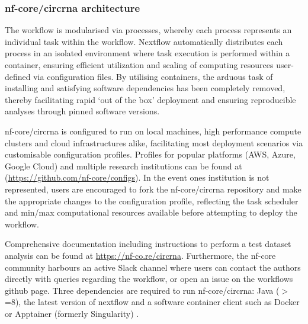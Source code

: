 \subsubsection{nf-core/circrna architecture}
The workflow is modularised via processes, whereby each process represents an individual task within the workflow. Nextflow automatically distributes each process in an isolated environment where task execution is performed within a container, ensuring efficient utilization and scaling of computing resources user-defined via configuration files. By utilising containers, the arduous task of installing and satisfying software dependencies has been completely removed, thereby facilitating rapid `out of the box' deployment and ensuring reproducible analyses through pinned software versions.
\par
nf-core/circrna is configured to run on local machines, high performance compute clusters and cloud infrastructures alike, facilitating most deployment scenarios via customisable configuration profiles. Profiles for popular platforms (AWS, Azure, Google Cloud) and multiple research institutions can be found at (\url{https://github.com/nf-core/configs}). In the event ones institution is not represented, users are encouraged to fork the nf-core/circrna repository and make the appropriate changes to the configuration profile, reflecting the task scheduler and min/max computational resources available before attempting to deploy the workflow.
\par
Comprehensive documentation including instructions to perform a test dataset analysis can be found at \url{https://nf-co.re/circrna}. Furthermore, the nf-core community harbours an active Slack channel where users can contact the authors directly with queries regarding the workflow, or open an issue on the workflows github page. Three dependencies are required to run nf-core/circrna: Java ($>$=8), the latest version of nextflow \cite{DiTommaso2017} and a software container client such as Docker \cite{Docker} or Apptainer (formerly Singularity) \cite{Apptainer}.


